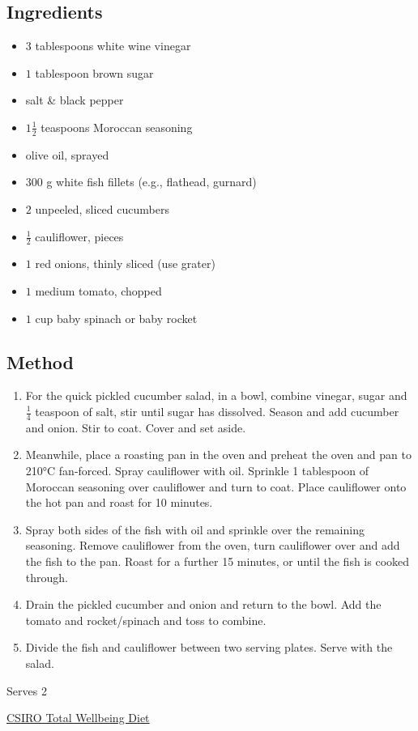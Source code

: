 \documentclass[11pt,a4paper]{article}
\begin{document}
\subsection*{Ingredients}

\begin{multicols}{2}

\begin{itemize}
  \item $ 3 $ tablespoons white wine vinegar
  \item $ 1 $ tablespoon brown sugar
  \item salt \& black pepper
  \item $ 1 \frac{1}{2} $ teaspoons Moroccan seasoning
  \item olive oil, sprayed
\end{itemize}

\columnbreak

\begin{itemize}
  \item $ 300 $ \si{\gram} white fish fillets (e.g., flathead, gurnard)
  \item $ 2 $ unpeeled, sliced cucumbers
  \item $ \frac {1}{2} $ cauliflower, pieces
  \item $ 1 $ red onions, thinly sliced (use grater)
  \item $ 1 $ medium tomato, chopped
  \item $ 1 $ cup baby spinach or baby rocket
\end{itemize}

\end{multicols}

\medskip

\subsection*{Method}

\begin{enumerate}
  \item For the quick pickled cucumber salad, in a bowl, combine vinegar, sugar and $\frac {1}{4}$ teaspoon of salt, stir until sugar has dissolved. Season and add cucumber and onion. Stir to coat. Cover and set aside.
  \item Meanwhile, place a roasting pan in the oven and preheat the oven and pan to 210\si{\celsius} fan-forced. Spray cauliflower with oil. Sprinkle 1 tablespoon of Moroccan seasoning over cauliflower and turn to coat. Place cauliflower onto the hot pan and roast for 10 minutes.
  \item Spray both sides of the fish with oil and sprinkle over the remaining seasoning. Remove cauliflower from the oven, turn cauliflower over and add the fish to the pan. Roast for a further 15 minutes, or until the fish is cooked through.
  \item Drain the pickled cucumber and onion and return to the bowl. Add the tomato and rocket/spinach and toss to combine.
  \item Divide the fish and cauliflower between two serving plates. Serve with the salad.
\end{enumerate}

Serves 2

\href{https://www.totalwellbeingdiet.com/au/recipes/healthy-summer-recipes/moroccan-spiced-fish-with-roasted-cauliflower-pickled-cucumber-salad/}{CSIRO Total Wellbeing Diet}
\end{document}
